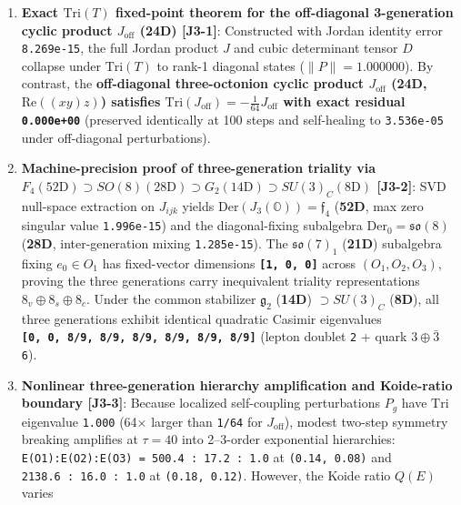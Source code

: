 \documentclass[
  a4paper,
]{article}
\providecommand{\tightlist}{%
  \setlength{\itemsep}{0pt}\setlength{\parskip}{0pt}}
\begin{document}
\begin{enumerate}
\def\labelenumi{\arabic{enumi}.}
\tightlist
\item
  \textbf{Exact \(\mathrm{Tri}(T)\) fixed-point theorem for the
  off-diagonal 3-generation cyclic product \(J_{\mathrm{off}}\) (24D)
  {[}J3-1{]}}: Constructed with Jordan identity error
  \texttt{8.269e-15}, the full Jordan product \(J\) and cubic
  determinant tensor \(D\) collapse under \(\mathrm{Tri}(T)\) to rank-1
  diagonal states (\(\|P\| = 1.000000\)). By contrast, the
  \textbf{off-diagonal three-octonion cyclic product
  \(J_{\mathrm{off}}\) (24D, \(\mathrm{Re}((xy)z)\)) satisfies
  \(\mathrm{Tri}(J_{\mathrm{off}}) = -\frac{1}{64} J_{\mathrm{off}}\)
  with exact residual \texttt{0.000e+00}} (preserved identically at 100
  steps and self-healing to \texttt{3.536e-05} under off-diagonal
  perturbations).
\item
  \textbf{Machine-precision proof of three-generation triality via
  \(F_4(52\mathrm{D}) \supset SO(8)(28\mathrm{D}) \supset G_2(14\mathrm{D}) \supset SU(3)_C(8\mathrm{D})\)
  {[}J3-2{]}}: SVD null-space extraction on \(J_{ijk}\) yields
  \(\mathrm{Der}(J_3(\mathbb{O})) = \mathfrak{f}_4\) (\textbf{52D}, max
  zero singular value \texttt{1.996e-15}) and the diagonal-fixing
  subalgebra \(\mathrm{Der}_0 = \mathfrak{so}(8)\) (\textbf{28D},
  inter-generation mixing \texttt{1.285e-15}). The
  \(\mathfrak{so}(7)_1\) (\textbf{21D}) subalgebra fixing
  \(e_0 \in O_1\) has fixed-vector dimensions
  \textbf{\texttt{{[}1,\ 0,\ 0{]}}} across \((O_1, O_2, O_3)\), proving
  the three generations carry inequivalent triality representations
  \textbf{\(8_v \oplus 8_s \oplus 8_c\)}. Under the common stabilizer
  \(\mathfrak{g}_2\) (\textbf{14D}) \(\supset SU(3)_C\) (\textbf{8D}),
  all three generations exhibit identical quadratic Casimir eigenvalues
  \textbf{\texttt{{[}0,\ 0,\ 8/9,\ 8/9,\ 8/9,\ 8/9,\ 8/9,\ 8/9{]}}}
  (lepton doublet \texttt{2} + quark \(3\oplus\bar{3}\) \texttt{6}).
\item
  \textbf{Nonlinear three-generation hierarchy amplification and
  Koide-ratio boundary {[}J3-3{]}}: Because localized self-coupling
  perturbations \(P_g\) have \(\mathrm{Tri}\) eigenvalue \texttt{1.000}
  (64× larger than \texttt{1/64} for \(J_{\mathrm{off}}\)), modest
  two-step symmetry breaking amplifies at \(\tau=40\) into 2--3-order
  exponential hierarchies:
  \texttt{E(O1):E(O2):E(O3)\ =\ 500.4\ :\ 17.2\ :\ 1.0} at
  \texttt{(0.14,\ 0.08)} and \texttt{2138.6\ :\ 16.0\ :\ 1.0} at
  \texttt{(0.18,\ 0.12)}. However, the Koide ratio \(Q(E)\) varies

\end{enumerate}
\end{document}
